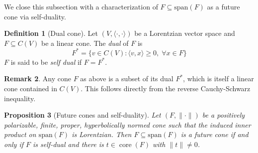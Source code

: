 \documentclass[a4paper,11pt]{article}
\numberwithin{equation}{section}
\theoremstyle{definition}
\newtheorem{Definition}{Definition}[section]
\newtheorem{Remark}[Definition]{Remark}
\theoremstyle{plain}
\newtheorem{Proposition}[Definition]{Proposition}
\newcommand{\spn}{\mathrm{span}}
\DeclareMathOperator{\core}{\text{core}}
\newcommand{\inner}[2]{\langle #1, #2 \rangle}
\newcommand{\norm}[1]{\| #1\|}
\begin{document}
We close this subsection with a characterization of $F \subseteq \spn(F)$ as a future cone via self-duality.

\begin{Definition}[Dual cone]
    Let $(V,\inner{\cdot}{\cdot})$ be a Lorentzian vector space and $F \subseteq C(V)$ be a linear cone. The \textit{dual} of $F$ is 
    $$F^{*} = \{v \in C(V): \inner{v}{x} \geq 0,\;\forall x \in F\}$$
    $F$ is said to be \textit{self dual} if $F = F^{*}$.
\end{Definition}

\begin{Remark}
    Any cone $F$ as above is a subset of its dual $F^{*}$, which is itself a linear cone contained in $C(V)$. This follows directly from the reverse Cauchy-Schwarz inequality.
\end{Remark}

\begin{Proposition}[Future cones and self-duality]
    Let $(F,\norm{\cdot})$ be a positively polarizable, finite, proper, hyperbolically normed cone such that the induced inner product on $\spn(F)$ is Lorentzian. Then $F \subseteq \spn(F)$ is a future cone if and only if $F$ is self-dual and there is $t \in \core(F)$ with $\norm{t} \neq 0$.
\end{Proposition}
\end{document}
